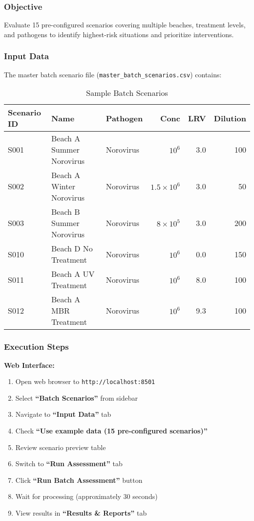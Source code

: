 \documentclass[11pt,a4paper]{article}
\begin{document}
\subsubsection{Objective}

Evaluate 15 pre-configured scenarios covering multiple beaches, treatment levels, and pathogens to identify highest-risk situations and prioritize interventions.

\subsubsection{Input Data}

The master batch scenario file (\texttt{master\_batch\_scenarios.csv}) contains:

\begin{table}[H]
\centering
\caption{Sample Batch Scenarios}
\scriptsize
\begin{tabular}{lllrrr}
\toprule
\textbf{Scenario ID} & \textbf{Name} & \textbf{Pathogen} & \textbf{Conc} & \textbf{LRV} & \textbf{Dilution} \\
\midrule
S001 & Beach A Summer Norovirus & Norovirus & $10^6$ & 3.0 & 100 \\
S002 & Beach A Winter Norovirus & Norovirus & $1.5 \times 10^6$ & 3.0 & 50 \\
S003 & Beach B Summer Norovirus & Norovirus & $8 \times 10^5$ & 3.0 & 200 \\
S010 & Beach D No Treatment & Norovirus & $10^6$ & 0.0 & 150 \\
S011 & Beach A UV Treatment & Norovirus & $10^6$ & 8.0 & 100 \\
S012 & Beach A MBR Treatment & Norovirus & $10^6$ & 9.3 & 100 \\
\bottomrule
\end{tabular}
\end{table}

\subsubsection{Execution Steps}

\textbf{Web Interface:}
\begin{enumerate}[leftmargin=*]
    \item Open web browser to \texttt{http://localhost:8501}
    \item Select \textbf{``Batch Scenarios''} from sidebar
    \item Navigate to \textbf{``Input Data''} tab
    \item Check \textbf{``Use example data (15 pre-configured scenarios)''}
    \item Review scenario preview table
    \item Switch to \textbf{``Run Assessment''} tab
    \item Click \textbf{``Run Batch Assessment''} button
    \item Wait for processing (approximately 30 seconds)
    \item View results in \textbf{``Results \& Reports''} tab
\end{enumerate}
\end{document}
